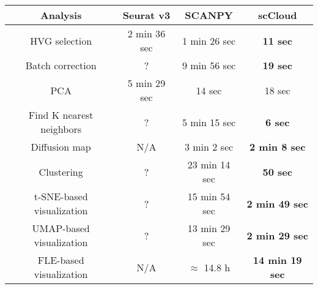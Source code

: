 \documentclass[10pt]{article}
\begin{document}
\begin{table}[H]
	\centering
	\begin{tabular}{|c|c|c|c|}
		\hline
		Analysis & Seurat v3 & SCANPY & scCloud\\
		\hline \hline
		HVG selection & 2 min 36 sec & 1 min 26 sec & \textbf{11 sec} \\
		\hline
		Batch correction & ? & 9 min 56 sec & \textbf{19 sec} \\
		\hline
		PCA & 5 min 29 sec & 14 sec & 18 sec \\
		\hline
		Find K nearest neighbors &  ? &  5 min 15 sec & \textbf{6 sec}\\
		\hline
		Diffusion map & N/A & 3 min 2 sec & \textbf{2 min 8 sec} \\
		\hline 
		Clustering & ? & 23 min 14 sec & \textbf{50 sec}\\
		\hline
		t-SNE-based visualization & ? & 15 min 54 sec & \textbf{2 min 49 sec}\\
		\hline
		UMAP-based visualization & ? & 13 min 29 sec & \textbf{2 min 29 sec}\\
		\hline
		FLE-based visualization & N/A & $\approx$ 14.8  h & \textbf{14 min 19 sec}\\
		\hline
	\end{tabular}
\end{table}
\end{document}
